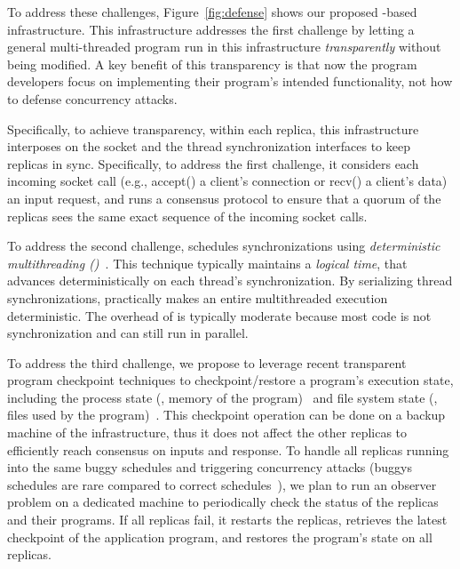 To address these challenges, Figure~\ref{fig:defense} shows our proposed 
\smr-based infrastructure. This infrastructure addresses the first challenge by 
letting a general multi-threaded program run in this infrastructure 
\emph{transparently} without being modified. A key benefit of this transparency 
is that now the program developers focus on implementing their program's 
intended functionality, not how to defense concurrency attacks.

Specifically, to achieve transparency, within each \smr replica, this 
infrastructure interposes on the socket and the thread synchronization 
interfaces to keep replicas in sync. Specifically, to address the first 
challenge, it considers each incoming socket call (e.g., accept() a client's 
connection or recv() a client's data) an input request, and runs a \paxos 
consensus protocol to ensure that a quorum of the replicas sees the same exact 
sequence of the incoming socket calls.

To address the second challenge, \xxx schedules synchronizations using 
\emph{deterministic 
multithreading (\dmt)}~\cite{dpj:oopsla09,dmp:asplos09,kendo:asplos09,
coredet:asplos10, 
dos:osdi10,ddos:asplos13,ics:oopsla13}.  This technique typically maintains a 
\emph{logical time}, that advances deterministically on each thread's 
synchronization. By serializing thread synchronizations, \dmt practically makes 
an entire multithreaded execution deterministic. The overhead of \dmt is 
typically moderate because most code is not synchronization and can still run 
in parallel.



To address the third challenge, we propose to leverage recent transparent 
program checkpoint techniques to checkpoint/restore a program's execution 
state, including the process state (\eg, memory of the program)~\cite{criu} and 
file system state (\eg, files used by the program)~\cite{lxc}. This checkpoint 
operation can be done on a backup machine of the infrastructure, thus it does 
not affect the other replicas to efficiently reach consensus on inputs and 
response. To handle all replicas running into the same buggy schedules and 
triggering concurrency attacks (buggys schedules are rare compared to correct 
schedules~\cite{lu:concurrency-bugs}), we plan to run an observer problem on 
a dedicated machine to periodically check the status of the replicas and their 
programs. If all replicas fail, it restarts the replicas, retrieves the latest 
checkpoint of the application program, and restores the program's state on all 
replicas.

